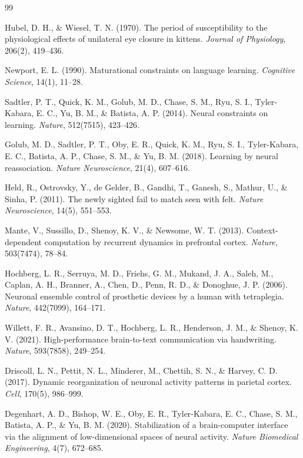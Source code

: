 \documentclass[11pt]{book}
\begin{document}
\backmatter
\begin{thebibliography}{99}

Hubel, D. H., \& Wiesel, T. N. (1970). The period of susceptibility to the physiological effects of unilateral eye closure in kittens. \textit{Journal of Physiology}, 206(2), 419--436.

Newport, E. L. (1990). Maturational constraints on language learning. \textit{Cognitive Science}, 14(1), 11--28.

Sadtler, P. T., Quick, K. M., Golub, M. D., Chase, S. M., Ryu, S. I., Tyler-Kabara, E. C., Yu, B. M., \& Batista, A. P. (2014). Neural constraints on learning. \textit{Nature}, 512(7515), 423--426.

Golub, M. D., Sadtler, P. T., Oby, E. R., Quick, K. M., Ryu, S. I., Tyler-Kabara, E. C., Batista, A. P., Chase, S. M., \& Yu, B. M. (2018). Learning by neural reassociation. \textit{Nature Neuroscience}, 21(4), 607--616.

Held, R., Ostrovsky, Y., de Gelder, B., Gandhi, T., Ganesh, S., Mathur, U., \& Sinha, P. (2011). The newly sighted fail to match seen with felt. \textit{Nature Neuroscience}, 14(5), 551--553.

Mante, V., Sussillo, D., Shenoy, K. V., \& Newsome, W. T. (2013). Context-dependent computation by recurrent dynamics in prefrontal cortex. \textit{Nature}, 503(7474), 78--84.

Hochberg, L. R., Serruya, M. D., Friehs, G. M., Mukand, J. A., Saleh, M., Caplan, A. H., Branner, A., Chen, D., Penn, R. D., \& Donoghue, J. P. (2006). Neuronal ensemble control of prosthetic devices by a human with tetraplegia. \textit{Nature}, 442(7099), 164--171.

Willett, F. R., Avansino, D. T., Hochberg, L. R., Henderson, J. M., \& Shenoy, K. V. (2021). High-performance brain-to-text communication via handwriting. \textit{Nature}, 593(7858), 249--254.

Driscoll, L. N., Pettit, N. L., Minderer, M., Chettih, S. N., \& Harvey, C. D. (2017). Dynamic reorganization of neuronal activity patterns in parietal cortex. \textit{Cell}, 170(5), 986--999.

Degenhart, A. D., Bishop, W. E., Oby, E. R., Tyler-Kabara, E. C., Chase, S. M., Batista, A. P., \& Yu, B. M. (2020). Stabilization of a brain-computer interface via the alignment of low-dimensional spaces of neural activity. \textit{Nature Biomedical Engineering}, 4(7), 672--685.


\end{thebibliography}
\end{document}
